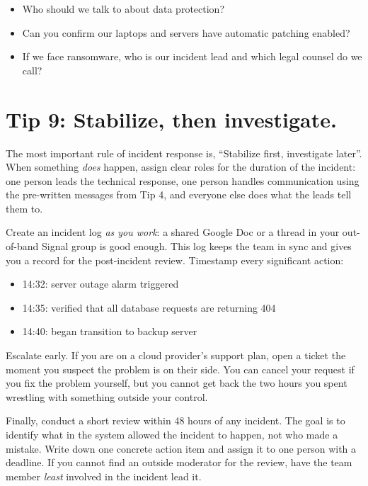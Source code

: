 \documentclass[10pt,letterpaper]{article}
\begin{document}
\begin{notebox}
  \begin{itemize}
  \item Who should we talk to about data protection?
  \item Can you confirm our laptops and servers have automatic patching enabled?
  \item If we face ransomware, who is our incident lead and which legal counsel do we call?
  \end{itemize}
\end{notebox}

\section*{Tip 9: Stabilize, then investigate.}

The most important rule of incident response is, ``Stabilize first, investigate
later''.  When something \emph{does} happen, assign clear roles for the duration
of the incident: one person leads the technical response, one person handles
communication using the pre-written messages from Tip 4, and everyone else does
what the leads tell them to.

Create an incident log \emph{as you work}: a shared Google Doc or a thread in
your out-of-band Signal group is good enough.  This log keeps the team in sync
and gives you a record for the post-incident review.  Timestamp every
significant action:

\begin{itemize}
\item 14:32: server outage alarm triggered
\item 14:35: verified that all database requests are returning 404
\item 14:40: began transition to backup server
\end{itemize}

Escalate early. If you are on a cloud provider's support plan, open a ticket the
moment you suspect the problem is on their side. You can cancel your request if
you fix the problem yourself, but you cannot get back the two hours you spent
wrestling with something outside your control.

Finally, conduct a short review within 48 hours of any incident. The goal is to
identify what in the system allowed the incident to happen, not who made a
mistake. Write down one concrete action item and assign it to one person with a
deadline. If you cannot find an outside moderator for the review, have the team
member \emph{least} involved in the incident lead it.
\end{document}
